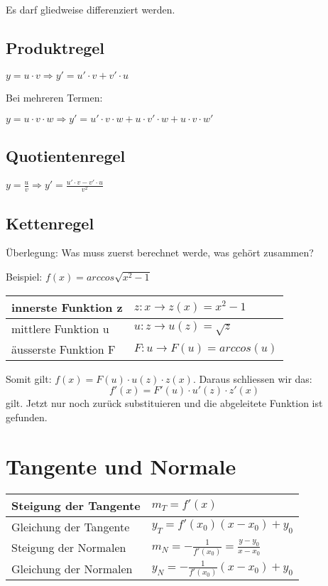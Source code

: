 Es darf gliedweise differenziert werden.
\subsection{Produktregel}
\(y=u \cdot v \Rightarrow y'=u' \cdot v + v' \cdot u\)

Bei mehreren Termen:

\(y=u \cdot v \cdot w \Rightarrow y'=u' \cdot v \cdot w + u \cdot v' \cdot w + u \cdot v \cdot w' \)
\subsection{Quotientenregel}
\(y = \frac{u}{v} \Rightarrow y' = \frac{u' \cdot v - v' \cdot u}{v^2}\)

\subsection{Kettenregel}
Überlegung: Was muss zuerst berechnet werde, was gehört zusammen?

Beispiel: \(f(x) = arccos \sqrt{x^2-1} \)
\newline
\begin{tabular}{|l|l|}
	\hline
   	innerste Funktion z & \(z: x \rightarrow z(x) = x^2-1\) \\
	\hline
	mittlere Funktion u & \(u: z \rightarrow u(z) = \sqrt{z}\) \\
	\hline
	äusserste Funktion F & \(F: u \rightarrow F(u) = arccos(u) \) \\
	\hline
 \end{tabular}\newline
Somit gilt: \( f(x) = F(u) \cdot u(z) \cdot z(x) \).\newline
 Daraus schliessen wir das:
\[ f'(x) = F'(u) \cdot u'(z) \cdot z'(x) \]
gilt. Jetzt nur noch zurück substituieren und die abgeleitete Funktion ist gefunden.

\section{Tangente und Normale}
\begin{longtable}{p{}|p{}}
	Steigung der Tangente & \(m_T=f'(x)\)\\
	\hline
	Gleichung der Tangente & \(y_T = f'(x_0)(x-x_0) + y_0 \)\\
	\hline
	Steigung der Normalen & \(m_N=-\frac{1}{f'(x_0)} = \frac{y-y_0}{x-x_0} \)\\
	\hline
	Gleichung der Normalen & \(y_N = - \frac{1}{f'(x_0)}(x-x_0) + y_0 \) \\
\end{longtable}

